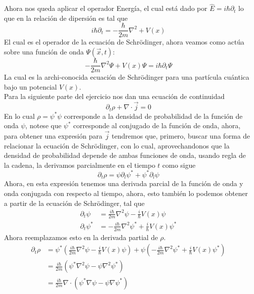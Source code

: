 \documentclass[../main_ej.tex]{subfiles}
\begin{document}
Ahora nos queda aplicar el operador Energía, el cual está dado por $\hat{E}=i\hbar\partial_t$ lo que en la relación de dipersión es tal que
\begin{equation*}
  i\hbar \partial_t = -\frac{\hbar}{2m}\nabla^2 + V(x)
\end{equation*}
El cual es el operador de la ecuación de Schrödinger, ahora veamos como actúa sobre una función de onda $\Psi(\vec{x},t)$:
\begin{equation}
  -\frac{\hbar}{2m}\nabla^2\Psi + V(x)\Psi = i\hbar \partial_t\Psi 
\end{equation}
La cual es la archi-conocida ecuación de Schrödinger para una partícula cuántica bajo un potencial $V(x)$. \\
Para la siguiente parte del ejercicio nos dan una ecuación de continuidad 
\begin{equation*}
  \partial_t\rho + \nabla \cdot \vec{j} = 0
\end{equation*}
En lo cual $\rho=\psi^*\psi$ corresponde a la densidad de probabilidad de la función de onda $\psi$, notese que $\psi^*$ corresponde al conjugado de la función de onda, ahora, para obtener una expresión para $\vec{j}$ tendremos que, primero, buscar una forma de relacionar la ecuación de Schrödinger, con lo cual, aprovechandonos que la densidad de probabilidad depende de ambas funciones de onda, usando regla de la cadena, la derivamos parcialmente en el tiempo $t$ como sigue 
\begin{equation*}
  \partial_t\rho = \psi\partial_l\psi^* + \psi^*\partial_l\psi  
\end{equation*}
Ahora, en esta expresión tenemos una derivada parcial de la función de onda y onda conjugada con respecto al tiempo, ahora, esto también lo podemos obtener a partir de la ecuación de Schrödinger, tal que
\begin{align*}
  \partial_t \psi & = \frac{i\hbar}{2m}\nabla^2 \psi -\frac{i}{\hbar}V(x)\psi \\ 
  \partial_t \psi^* & = -\frac{i\hbar}{2m}\nabla^2 \psi^* +\frac{i}{\hbar}V(x)\psi^* 
\end{align*}
Ahora reemplazamos esto en la derivada partial de $\rho$.
\begin{align*}
  \partial_t\rho & = \psi^*\left(\frac{i\hbar}{2m}\nabla^2 \psi -\frac{i}{\hbar}V(x)\psi \right) + \psi \left(  -\frac{i\hbar}{2m}\nabla^2 \psi^* +\frac{i}{\hbar}V(x)\psi^* \right) \\
  & = \frac{i\hbar}{2m} \left( \psi^* \nabla^2\psi -\psi \nabla^2\psi^* \right) \\
  & = \frac{i\hbar}{2m}\nabla \cdot \left( \psi^*\nabla \psi - \psi \nabla \psi^* \right)
\end{align*}
\end{document}
